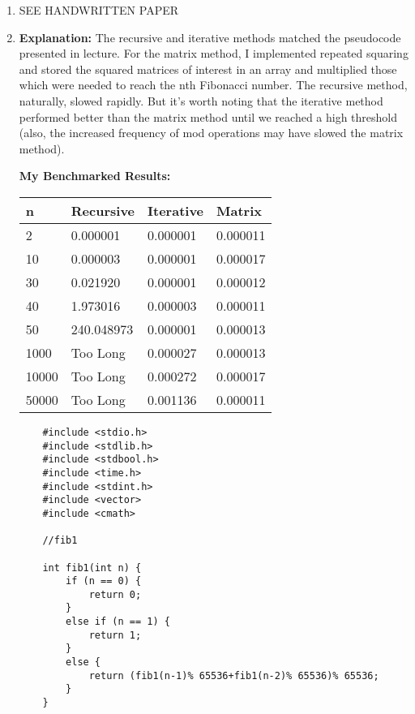 \documentclass[11pt]{article}
\begin{document}
\begin{enumerate}

\item SEE HANDWRITTEN PAPER

\item 

\textbf{Explanation:}
The recursive and iterative methods matched the pseudocode presented in lecture.  For the matrix method, I implemented repeated squaring
and stored the squared matrices of interest in an array and multiplied those which were needed to reach the nth Fibonacci number.  The recursive
method, naturally, slowed rapidly.  But it's worth noting that the iterative method performed better than the matrix method until we reached a high
threshold (also, the increased frequency of mod operations may have slowed the matrix method).

\textbf{My Benchmarked Results:}
\begin{table}[h!]
    \centering
    \begin{tabular}{l|l|l|l}
    \textbf{n} & \textbf{Recursive} & \textbf{Iterative} & \textbf{Matrix} \\ \hline
    2 & 0.000001 & 0.000001 & 0.000011 \\ \hline
    10 & 0.000003 & 0.000001 & 0.000017 \\ \hline
    30 & 0.021920 & 0.000001 & 0.000012 \\ \hline
    40 & 1.973016 & 0.000003 & 0.000011 \\ \hline
    50 & 240.048973 & 0.000001 & 0.000013 \\ \hline
    1000 & Too Long & 0.000027 & 0.000013 \\ \hline
    10000 & Too Long & 0.000272 & 0.000017 \\ \hline
    50000 & Too Long & 0.001136 & 0.000011
    \end{tabular}
\end{table}

\begin{verbatim}
    #include <stdio.h>
    #include <stdlib.h>
    #include <stdbool.h>
    #include <time.h>
    #include <stdint.h>
    #include <vector> 
    #include <cmath>
    
    //fib1
    
    int fib1(int n) {
        if (n == 0) {
            return 0;
        }
        else if (n == 1) {
            return 1;
        }
        else {
            return (fib1(n-1)% 65536+fib1(n-2)% 65536)% 65536;
        }
    }
    

\end{verbatim}
\end{enumerate}
\end{document}
